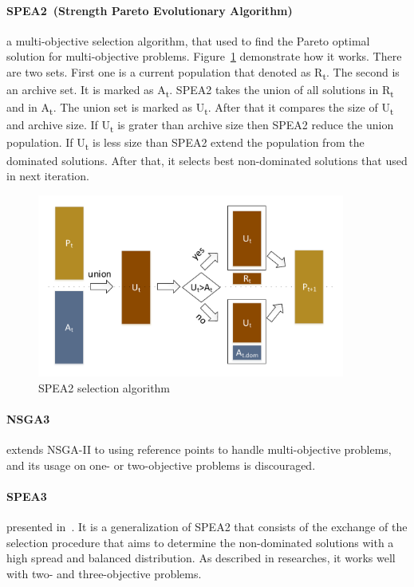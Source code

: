 \paragraph{SPEA2~(Strength Pareto Evolutionary Algorithm)~\cite{zitzler01}} a multi-objective selection algorithm, that used to find the Pareto optimal solution for multi-objective problems\cite{zhihuan2010}. Figure~\ref{fig:spea2} demonstrate how it works.
There are two sets. First one is a current population that denoted as \texorpdfstring{R\textsubscript{t}}{R t}. The second is an archive set. It is marked as \texorpdfstring{A\textsubscript{t}}{A t}. SPEA2 takes the union of all solutions in \texorpdfstring{R\textsubscript{t}}{R t} and in \texorpdfstring{A\textsubscript{t}}{A t}. The union set is marked as \texorpdfstring{U\textsubscript{t}}{U t}. After that it compares the size of \texorpdfstring{U\textsubscript{t}}{U t} and archive size. If \texorpdfstring{U\textsubscript{t}}{U t} is grater than archive size then SPEA2 reduce the union population. If \texorpdfstring{U\textsubscript{t}}{U t} is less  size than SPEA2 extend the population from the dominated solutions. After that, it selects best non-dominated solutions that used in next iteration.

\begin{figure}
	\centering
	\includegraphics[width=0.9\textwidth]{images/spea2Selector.pdf}
	\caption[SPEA2 selection algorithm]{SPEA2 selection algorithm}
	\label{fig:spea2}
\end{figure}

\paragraph{NSGA3~\cite{deb14}} extends NSGA-II to using reference points to handle multi-objective problems, and its usage on one- or two-objective problems is discouraged.
\paragraph{SPEA3} presented in~\cite{rudzinski15}. It is a generalization of SPEA2 that consists of the exchange of the selection procedure that aims to determine the non-dominated solutions with a high spread and balanced distribution. As described in researches, it works well with two- and three-objective problems. \\

